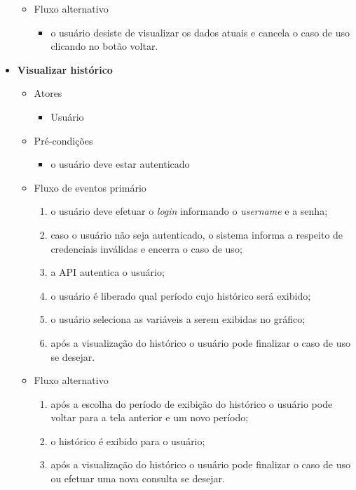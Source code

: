 \begin{itemize}
\begin{itemize}
    		\item Fluxo alternativo
			    \begin{itemize}
    			   \item o usuário desiste de visualizar os dados atuais e cancela o caso de uso clicando no botão voltar.
			    \end{itemize}

		\end{itemize}

	\item \textbf{Visualizar histórico}

		\begin{itemize}
		    \item Atores
	    		\begin{itemize}
		    	    \item Usuário
	    		\end{itemize}

	    	\item Pré-condições
    			\begin{itemize}
			        \item o usuário deve estar autenticado
			    \end{itemize}

		    \item Fluxo de eventos primário
			    \begin{enumerate}
			        \item o usuário deve efetuar o \textit{login} informando o \textit{username} e a senha;
			        \item caso o usuário não seja autenticado, o sistema informa a respeito de credenciais inválidas e encerra o caso de uso;
			        \item a API autentica o usuário;
			        \item o usuário é liberado qual período cujo histórico será exibido;
			        \item o usuário seleciona as variáveis a serem exibidas no gráfico;
			        \item após a visualização do histórico o usuário pode finalizar o caso de uso se desejar.
			    \end{enumerate}

		    \item Fluxo alternativo
			    \begin{enumerate}
			        \item após a escolha do período de exibição do histórico o usuário pode voltar para a tela anterior e um novo período;
			        \item o histórico é exibido para o usuário;
			        \item após a visualização do histórico o usuário pode finalizar o caso de uso ou efetuar uma nova consulta se desejar.
			    \end{enumerate}


\end{itemize}
\end{itemize}
